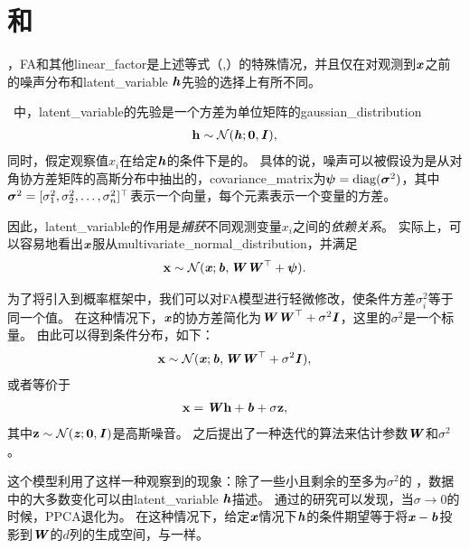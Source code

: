 \section{和}
\label{sec:probabilistic_PCA_and_factor_analysis}

，\gls{FA}和其他\gls{linear_factor}是上述等式（,）的特殊情况，并且仅在对观测到$\boldsymbol{\mathit{x}}$之前的噪声分布和\gls{latent_variable} $\boldsymbol{\mathit{h}}$先验的选择上有所不同。

~\citep{Bartholomew-1987,Basilevsky94}中，\gls{latent_variable}的先验是一个方差为单位矩阵的\gls{gaussian_distribution}
\begin{align}
\label{eqn:133}
\mathbf{h} \sim \mathcal{N}(\boldsymbol{\mathit{h}}; \mathbf{0},\boldsymbol{\mathit{I}}),
\end{align}
同时，假定观察值$x_i$在给定$\boldsymbol{\mathit{h}}$的条件下是的。
具体的说，噪声可以被假设为是从对角协方差矩阵的高斯分布中抽出的，\gls{covariance_matrix}为$\boldsymbol{\psi} = \text{diag}(\boldsymbol{\sigma}^2)$，其中$\boldsymbol{\sigma}^2 = [\sigma_1^2,\sigma_2^2,\ldots,\sigma_n^2]^{\top}$表示一个向量，每个元素表示一个变量的方差。


因此，\gls{latent_variable}的作用是\emph{捕获}不同观测变量$x_i$之间的\emph{依赖关系}。
实际上，可以容易地看出$\boldsymbol{\mathit{x}}$服从\gls{multivariate_normal_distribution}，并满足
\begin{align}
\label{eqn:134}
\mathbf{x} \sim \mathcal{N}(\boldsymbol{\mathit{x}}; \boldsymbol{\mathit{b}}, \boldsymbol{\mathit{W}}\boldsymbol{\mathit{W}}^{\top}+\boldsymbol{\psi}).
\end{align}



为了将引入到概率框架中，我们可以对\gls{FA}模型进行轻微修改，使条件方差$\sigma_i^2$等于同一个值。
在这种情况下，$\boldsymbol{\mathit{x}}$的协方差简化为$\boldsymbol{\mathit{W}}\boldsymbol{\mathit{W}}^{\top}+\sigma^2\boldsymbol{\mathit{I}}$，这里的$\sigma^2$是一个标量。
由此可以得到条件分布，如下：
\begin{align}
\label{eqn:135}
\mathbf{x} \sim \mathcal{N}(\boldsymbol{\mathit{x}}; \boldsymbol{\mathit{b}}, \boldsymbol{\mathit{W}}\boldsymbol{\mathit{W}}^{\top} + \sigma^2\boldsymbol{\mathit{I}} ),
\end{align}
或者等价于
\begin{align}
\label{eqn:136}
\mathbf{x} = \boldsymbol{\mathit{W}}\mathbf{h} + \boldsymbol{\mathit{b}} + \sigma\mathbf{z},
\end{align}
其中$\mathbf{z} \sim \mathcal{N}(\boldsymbol{\mathit{z}};\mathbf{0},\boldsymbol{\mathit{I}})$是高斯噪音。
之后\citet{tipping99mixtures}提出了一种迭代的算法来估计参数$\boldsymbol{\mathit{W}}$和$\sigma^2$。


这个模型利用了这样一种观察到的现象：除了一些小且剩余的至多为$\sigma^2$的 ，数据中的大多数变化可以由\gls{latent_variable} $\boldsymbol{\mathit{h}}$描述。
通过\citet{tipping99mixtures}的研究可以发现，当$\sigma \xrightarrow{} 0$的时候，\gls{PPCA}退化为。
在这种情况下，给定$\boldsymbol{\mathit{x}}$情况下$\boldsymbol{\mathit{h}}$的条件期望等于将$\boldsymbol{\mathit{x}} - \boldsymbol{\mathit{b}}$投影到$\boldsymbol{\mathit{W}}$的$d$列的生成空间，与一样。

